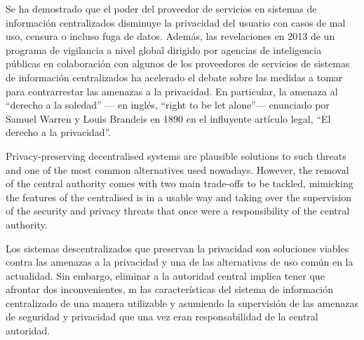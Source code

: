     Se ha demostrado que el poder del proveedor de servicios en sistemas de información 
    centralizados disminuye la privacidad del usuario con casos de mal uso, censura 
    o incluso fuga de datos. Además, las revelaciones en 2013 de un programa de 
    vigilancia a nivel global dirigido por agencias de inteligencia públicas en 
    colaboración con algunos de los proveedores de servicios de sistemas de información 
    centralizados ha acelerado el debate sobre las medidas a tomar para contrarrestar 
    las amenazas a la privacidad. En particular, la amenaza al ``derecho a la soledad'' 
    --- en inglés, ``right to be let alone''--- enunciado por Samuel Warren y Louis 
    Brandeis en 1890 en el influyente artículo legal, ``El derecho a la privacidad''.
    
    Privacy-preserving decentralised systems are plausible solutions to such threats 
    and one of the most common alternatives used nowadays. However, the removal 
    of the central authority comes with two main trade-offs to be tackled, mimicking 
    the features of the centralised \acl*{is} in a usable way and taking over the 
    supervision of the security and privacy threats that once were a responsibility 
    of the central authority.
    
    Los sistemas descentralizados que preservan la privacidad son soluciones viables  
    contra las amenazas a la privacidad y una de las alternativas de uso común en 
    la actualidad. Sin embargo, eliminar a la autoridad central implica tener que 
    afrontar dos inconvenientes, m las características del sistema de 
    información centralizado de una manera utilizable y asumiendo la supervisión 
    de las amenazas de seguridad y privacidad que una vez eran responsabilidad de 
    la central autoridad.
    
